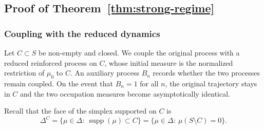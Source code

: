 \documentclass[10pt,letterpaper]{article}
\theoremstyle{compactplain}
\theoremstyle{compactdefinition}
\DeclareMathOperator{\supp}{supp}
\newcommand{\1}{\mathds{1}}
\begin{document}
\subsection{Proof of Theorem~\ref{thm:strong-regime}}


\subsubsection{Coupling with the reduced dynamics}\label{sec:coupling}


Let \(C\subset S\) be non-empty and closed. We couple the original process with a reduced reinforced process on \(C\), whose initial measure is the normalized restriction of \(\mu_0\) to \(C\). An auxiliary process \(B_n\) records whether the two processes remain coupled. On the event that \(B_n=1\) for all \(n\), the original trajectory stays in \(C\) and the two occupation measures become
asymptotically identical.



Recall that the face of the simplex supported on \(C\) is
\[
\Delta^C = \{\mu\in\Delta:\ \supp(\mu)\subset C\} = \{\mu\in\Delta:\ \mu(S\setminus C)=0\}.
\]
\end{document}
